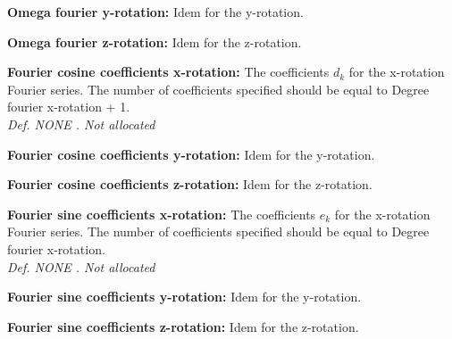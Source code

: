 \documentclass[12pt,epsf,colordvi]{article}
\begin{document}
\begin{description}
	\item{\bf Omega fourier y-rotation:} Idem for the y-rotation.
%
	\item{\bf Omega fourier z-rotation:} Idem for the z-rotation.
%
	\item{\bf Fourier cosine coefficients x-rotation:} The coefficients \(d_k\) for the x-rotation Fourier series. The number of coefficients specified should be equal to Degree fourier x-rotation + 1.\\
{\it Def. NONE . Not allocated}
%
	\item{\bf Fourier cosine coefficients y-rotation:} Idem for the y-rotation.
%
	\item{\bf Fourier cosine coefficients z-rotation:} Idem for the z-rotation.
%
	\item{\bf Fourier sine coefficients x-rotation:} The coefficients \(e_k\) for the x-rotation Fourier series. The number of coefficients specified should be equal to Degree fourier x-rotation.\\
{\it Def. NONE . Not allocated}
%
	\item{\bf Fourier sine coefficients y-rotation:} Idem for the y-rotation.
%
	\item{ \bf Fourier sine coefficients z-rotation:} Idem for the z-rotation. 
%
 \end{description}
%
%
\noindent 
\end{document}
